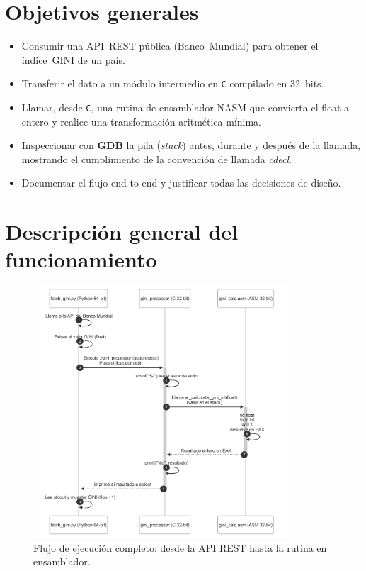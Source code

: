 \documentclass[a4paper,12pt]{article}
\begin{document}

\tableofcontents
\newpage

\section{Objetivos generales}
\begin{itemize}[leftmargin=*]
  \item Consumir una API REST pública (Banco Mundial) para obtener el índice GINI de un país.
  \item Transferir el dato a un módulo intermedio en \texttt{C} compilado en 32 bits.
  \item Llamar, desde \texttt{C}, una rutina de ensamblador NASM que convierta el float a entero y realice una transformación aritmética mínima.
  \item Inspeccionar con \textbf{GDB} la pila (\emph{stack}) antes, durante y después de la llamada, mostrando el cumplimiento de la convención de llamada \emph{cdecl}.
  \item Documentar el flujo end‑to‑end y justificar todas las decisiones de diseño.
\end{itemize}

\section{Descripción general del funcionamiento}
\begin{figure}[H]
  \centering
  \includegraphics[width=0.85\textwidth]{images/diagram.png}
  \caption{Flujo de ejecución completo: desde la API REST hasta la rutina en ensamblador.}\label{fig:sequence}
\end{figure}
\end{document}
